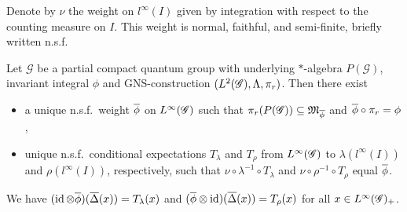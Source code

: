 Denote by $\nu$ the weight on $l^{\infty}(I)$ given by
integration with respect to the counting measure on $I$. This weight is
normal, faithful, and semi-finite,  briefly written n.s.f.\
\begin{Prop} \label{prop:vn-phi}
  Let $\mathscr{G}$ be a partial compact quantum group with underlying
 $*$-algebra $P(\mathscr{G})$, invariant integral $\phi$ and
 GNS-construction $(L^{2}(\mathscr{G}),\Lambda,\pi_{r})$. Then
 there exist    
 \begin{itemize}
 \item a unique n.s.f.\ weight $\overline{\phi}$ on
  $L^{\infty}(\mathscr{G})$ such that $\pi_{r}(P(\mathscr{G})) \subseteq
  \mathfrak{M}_{\overline{\phi}}$ and $\overline{\phi} \circ \pi_{r} = \phi$,
\item unique n.s.f.\ conditional expectations
  $T_{\lambda}$ and $T_{\rho}$ from $L^{\infty}(\mathscr{G})$ to $\lambda(l^{\infty}(I))$ and
  $\rho(l^{\infty}(I))$, respectively, such that $\nu \circ
  \lambda^{-1} \circ T_{\lambda}$ and $ \nu \circ \rho^{-1} \circ
  T_{\rho}$ equal $\overline{\phi}$.
 \end{itemize}
We have  $(\operatorname{id} \otimes \overline{\phi})(\overline{\Delta}(x)) =  T_{\lambda}(x)$ and $
    (\overline{\phi} \otimes \operatorname{id})(\overline{\Delta}(x)) = T_{\rho}(x)$ 
 for all
  $x\in L^{\infty}(\mathscr{G})_{+}$.
\end{Prop}
